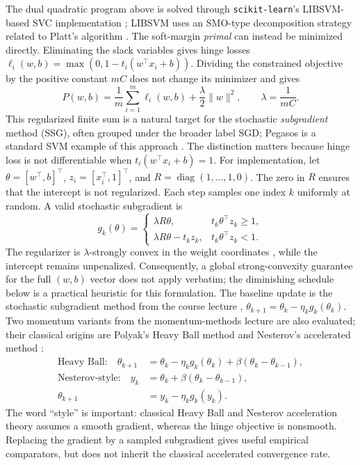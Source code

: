 \documentclass[11pt,a4paper]{article}
\numberwithin{equation}{section} %
\begin{document}
The dual quadratic program above is solved through \texttt{scikit-learn}'s
LIBSVM-based SVC implementation \cite{chang2011,pedregosa2011}; LIBSVM uses
an SMO-type decomposition strategy related to Platt's algorithm
\cite{platt1998}. The soft-margin \emph{primal} can instead be minimized directly.
Eliminating the slack variables gives hinge losses
$\ell_i(w,b)=\max(0,1-t_i(w^\top x_i+b))$. Dividing the constrained objective
by the positive constant $mC$ does not change its minimizer and gives
\begin{equation}
    P(w,b)=\frac{1}{m}\sum_{i=1}^{m}\ell_i(w,b)
    +\frac{\lambda}{2}\lVert w\rVert^2,
    \qquad \lambda=\frac{1}{mC}.
\end{equation}
This regularized finite sum is a natural target for the stochastic
\emph{subgradient} method (SSG), often grouped under the broader label SGD;
Pegasos is a standard SVM example of this approach \cite{pegasos2011}.
The distinction matters because hinge loss is not differentiable when
$t_i(w^\top x_i+b)=1$. For implementation, let
$\theta=[w^\top,b]^\top$, $z_i=[x_i^\top,1]^\top$, and
$R=\operatorname{diag}(1,\ldots,1,0)$. The zero in $R$ ensures that the
intercept is not regularized. Each step samples one index $k$ uniformly at
random. A valid stochastic subgradient is
\begin{equation}
    g_k(\theta)=\begin{cases}
        \lambda R\theta, & t_k\theta^\top z_k\ge 1,\\[2pt]
        \lambda R\theta-t_k z_k, & t_k\theta^\top z_k<1.
    \end{cases}
\end{equation}
The regularizer is $\lambda$-strongly convex in the weight coordinates
\cite{lec-strongconvex}, while the intercept remains unpenalized. Consequently,
a global strong-convexity guarantee for the full $(w,b)$ vector does not apply
verbatim; the diminishing schedule below is a practical heuristic for this
formulation. The baseline
update is the stochastic subgradient method from the course lecture
\cite{lec-sgm}, $\theta_{k+1}=\theta_k-\eta_k g_k(\theta_k)$. Two momentum variants from the momentum-methods
lecture \cite{lec-momentum} are also evaluated; their classical origins are
Polyak's Heavy Ball method and Nesterov's accelerated method
\cite{polyak1964,nesterov1983}:
\begin{equation}
\begin{aligned}
\text{Heavy Ball:}\quad
    \theta_{k+1}&=\theta_k-\eta_k g_k(\theta_k)+\beta(\theta_k-\theta_{k-1}),\\
\text{Nesterov-style:}\quad
    y_k&=\theta_k+\beta(\theta_k-\theta_{k-1}),\\
    \theta_{k+1}&=y_k-\eta_k g_k(y_k).
\end{aligned}
\end{equation}
The word ``style'' is important: classical Heavy Ball and Nesterov acceleration
theory assumes a smooth gradient, whereas the hinge objective is nonsmooth.
Replacing the gradient by a sampled subgradient gives useful empirical
comparators, but does not inherit the classical accelerated convergence rate.
\end{document}
